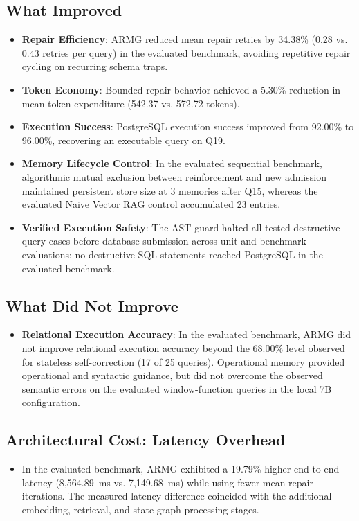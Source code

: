 \subsection{What Improved}
\begin{itemize}
    \item \textbf{Repair Efficiency}: ARMG reduced mean repair retries by 34.38\% (0.28 vs. 0.43 retries per query) in the evaluated benchmark, avoiding repetitive repair cycling on recurring schema traps.
    \item \textbf{Token Economy}: Bounded repair behavior achieved a 5.30\% reduction in mean token expenditure (542.37 vs. 572.72 tokens).
    \item \textbf{Execution Success}: PostgreSQL execution success improved from 92.00\% to 96.00\%, recovering an executable query on Q19.
    \item \textbf{Memory Lifecycle Control}: In the evaluated sequential benchmark, algorithmic mutual exclusion between reinforcement and new admission maintained persistent store size at 3 memories after Q15, whereas the evaluated Naive Vector RAG control accumulated 23 entries.
    \item \textbf{Verified Execution Safety}: The AST guard halted all tested destructive-query cases before database submission across unit and benchmark evaluations; no destructive SQL statements reached PostgreSQL in the evaluated benchmark.
\end{itemize}

\subsection{What Did Not Improve}
\begin{itemize}
    \item \textbf{Relational Execution Accuracy}: In the evaluated benchmark, ARMG did not improve relational execution accuracy beyond the 68.00\% level observed for stateless self-correction (17 of 25 queries). Operational memory provided operational and syntactic guidance, but did not overcome the observed semantic errors on the evaluated window-function queries in the local 7B configuration.
\end{itemize}

\subsection{Architectural Cost: Latency Overhead}
\begin{itemize}
    \item In the evaluated benchmark, ARMG exhibited a 19.79\% higher end-to-end latency (8,564.89~ms vs. 7,149.68~ms) while using fewer mean repair iterations. The measured latency difference coincided with the additional embedding, retrieval, and state-graph processing stages.
\end{itemize}

